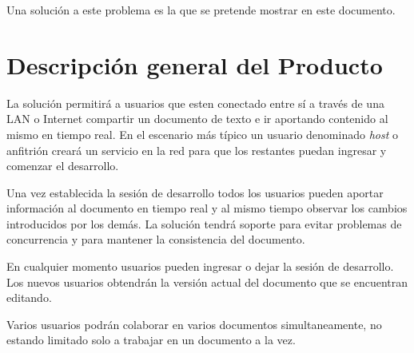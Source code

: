 \documentclass[a4paper,11pt]{article}
\begin{document}
		    Una soluci\'on a este problema es la que se pretende mostrar en este documento.

	\section{Descripci\'on general del Producto}

		La soluci\'on permitir\'a a usuarios que esten conectado entre s\'i a trav\'es de
		una LAN o Internet compartir un documento de texto e ir aportando contenido al mismo en
		tiempo real. En el escenario más t\'ipico un usuario denominado \textit{host} o
		anfitri\'on crear\'a un servicio en la red para que los restantes puedan ingresar y
		comenzar el desarrollo.

		Una vez establecida la sesi\'on de desarrollo todos los usuarios pueden aportar
		informaci\'on al documento en tiempo real y al mismo tiempo observar los cambios
		introducidos por los dem\'as. La soluci\'on tendr\'a soporte para evitar problemas de
		concurrencia y para mantener la consistencia del documento.

	    En cualquier momento usuarios pueden ingresar o dejar la sesi\'on de desarrollo. Los
	    nuevos usuarios obtendr\'an la versi\'on actual del documento que se encuentran editando.

	    Varios usuarios podr\'an colaborar en varios documentos simultaneamente, no estando
	    limitado solo a trabajar en un documento a la vez.
\end{document}
